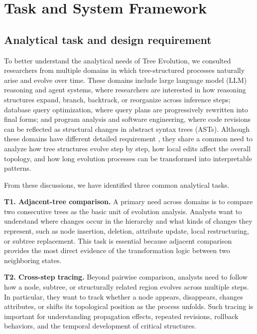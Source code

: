 \section{Task and System Framework}
\label{sec:tasks}

\subsection{Analytical task and design requirement}

To better understand the analytical needs of Tree Evolution, we consulted researchers from multiple domains in which tree-structured processes naturally arise and evolve over time. These domains include large language model (LLM) reasoning and agent systems, where researchers are interested in how reasoning structures expand, branch, backtrack, or reorganize across inference steps; database query optimization, where query plans are progressively rewritten into final forms; and program analysis and software engineering, where code revisions can be reflected as structural changes in abstract syntax trees (ASTs). Although these domains have different detailed requirement , they share a common need to analyze how tree structures evolve step by step, how local edits affect the overall topology, and how long evolution processes can be transformed into interpretable patterns.


From these discussions, we have identified three common analytical tasks.

\textbf{T1. Adjacent-tree comparison.}
A primary need across domains is to compare two consecutive trees as the basic unit of evolution analysis. Analysts want to understand where changes occur in the hierarchy and what kinds of changes they represent, such as node insertion, deletion, attribute update, local restructuring, or subtree replacement. This task is essential because adjacent comparison provides the most direct evidence of the transformation logic between two neighboring states.

\textbf{T2. Cross-step tracing.}
Beyond pairwise comparison, analysts need to follow how a node, subtree, or structurally related region evolves across multiple steps. In particular, they want to track whether a node appears, disappears, changes attributes, or shifts its topological position as the process unfolds. Such tracing is important for understanding propagation effects, repeated revisions, rollback behaviors, and the temporal development of critical structures.

